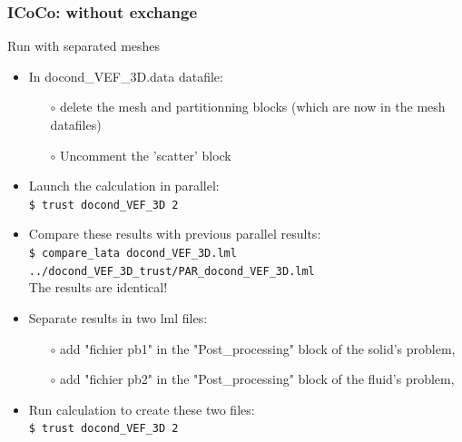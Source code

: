 \documentclass[10pt, hyperref={unicode=true,pdfusetitle, bookmarks=true,bookmarksnumbered=false,bookmarksopen=false, breaklinks=false,pdfborder={0 0 1},backref=true,colorlinks=true,linkcolor=darkblue,pageanchor, urlcolor=darkblue}]{beamer}
\begin{document}
\begin{frame}
\frametitle{ICoCo: without exchange}

\begin{block}{Run with separated meshes}
\begin{itemize}
\item In docond\_VEF\_3D.data datafile:
    \begin{itemize}
    \item [$\circ$] delete the mesh and partitionning blocks (which are now in the mesh datafiles)
    \item [$\circ$] Uncomment the 'scatter' block
    \end{itemize}
\item Launch the calculation in parallel:\\
\texttt{\$ trust docond\_VEF\_3D 2}
\item Compare these results with previous parallel results:\\
\texttt{\$ compare\_lata docond\_VEF\_3D.lml ../docond\_VEF\_3D\_trust/PAR\_docond\_VEF\_3D.lml } \\
The results are identical!
\item Separate results in two lml files:
    \begin{itemize}
    \item [$\circ$] add "fichier pb1" in the "Post\_processing" block of the solid's problem,
    \item [$\circ$] add "fichier pb2" in the "Post\_processing" block of the fluid's problem,
    \end{itemize}
\item Run calculation to create these two files:\\
\texttt{\$ trust docond\_VEF\_3D 2}
\end{itemize}
\end{block}

\end{frame}
\end{document}
